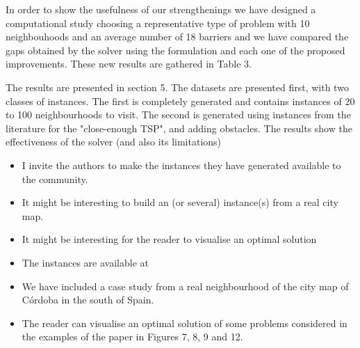 \documentclass{article}
\newenvironment{reviewer}{\setcounter{pointcounter}{1}}{}
\newcommand{\point}{\text{{\selectfont \thepointcounter} \stepcounter{pointcounter}}}
\begin{document}
\begin{reviewer}
		\begin{tcolorbox}[breakable,enhanced,coltitle=black,colback=green!5!white,colframe=green!75!black,title=\textbf{Answer R2.\point},borderline={1pt}{0pt}{black},boxrule=0pt]
			In order to show the usefulness of our strengthenings we have designed a computational study choosing a representative type of problem with 10 neighbouhoods and an average number of 18 barriers and we have compared the gaps obtained by the solver using the formulation and each one of the proposed improvements. These new results are gathered in Table 3.
		\end{tcolorbox}
		
		\begin{itshape}
			The results are presented in section 5. The datasets are presented first, with two classes of instances. The first is completely generated and contains instances of 20 to 100 neighbourhoods to visit. The second is generated using instances from the literature for the "close-enough TSP", and adding obstacles. The results show the effectiveness of the solver (and also its limitations)
			\begin{itemize}
			\item I invite the authors to make the instances they have generated available to the community.
			\item It might be interesting to build an (or several) instance(s) from a real city map.
			\item It might be interesting for the reader to visualise an optimal solution
			\end{itemize}
		\end{itshape}
		
		\begin{tcolorbox}[breakable,enhanced,coltitle=black,colback=green!5!white,colframe=green!75!black,title=\textbf{Answer R2.\point},borderline={1pt}{0pt}{black},boxrule=0pt]
		\begin{itemize}
			\item The instances are available at \cite{puerto2023a}
			\item We have included a case study  from a real neighbourhood of the city map of Córdoba in the south of Spain.
			\item  The reader can visualise an optimal solution of some  problems considered in the examples of the paper in Figures 7, 8, 9 and 12.
			\end{itemize}
			
		\end{tcolorbox}
		

\end{reviewer}
\end{document}

